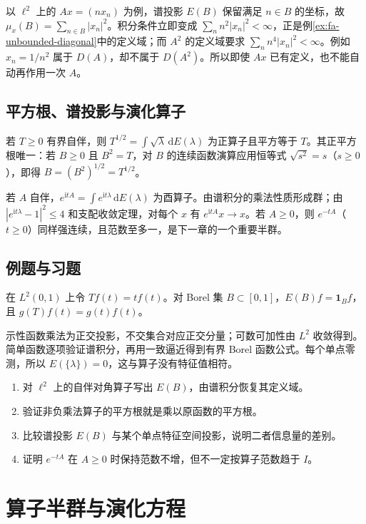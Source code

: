 \documentclass[UTF8,12pt,a4paper,fontset=fandol]{ctexbook}
\begin{document}
以 $\ell^2$ 上的 $Ax=(nx_n)$ 为例，谱投影 $E(B)$ 保留满足 $n\in B$ 的坐标，故 $\mu_x(B)=\sum_{n\in B}|x_n|^2$。积分条件立即变成 $\sum_n n^2|x_n|^2<\infty$，正是例\ref{ex:fa-unbounded-diagonal}中的定义域；而 $A^2$ 的定义域要求 $\sum_n n^4|x_n|^2<\infty$。例如 $x_n=1/n^2$ 属于 $D(A)$，却不属于 $D(A^2)$。所以即使 $Ax$ 已有定义，也不能自动再作用一次 $A$。

\section{平方根、谱投影与演化算子}
若 $T\geq0$ 有界自伴，则 $T^{1/2}=\int\sqrt\lambda\,\mathrm dE(\lambda)$ 为正算子且平方等于 $T$。其正平方根唯一：若 $B\geq0$ 且 $B^2=T$，对 $B$ 的连续函数演算应用恒等式 $\sqrt{s^2}=s$（$s\geq0$），即得 $B=(B^2)^{1/2}=T^{1/2}$。

若 $A$ 自伴，$e^{\mathrm itA}=\int e^{\mathrm it\lambda}\,\mathrm dE(\lambda)$ 为酉算子。由谱积分的乘法性质形成群；由 $|e^{\mathrm it\lambda}-1|^2\leq4$ 和支配收敛定理，对每个 $x$ 有 $e^{\mathrm itA}x\to x$。若 $A\geq0$，则 $e^{-tA}$（$t\geq0$）同样强连续，且范数至多一，是下一章的一个重要半群。

\section{例题与习题}
\begin{example}[乘法算子的谱投影]
在 $L^2(0,1)$ 上令 $Tf(t)=tf(t)$。对 Borel 集 $B\subset[0,1]$，$E(B)f=\mathbf1_Bf$，且 $g(T)f(t)=g(t)f(t)$。
\end{example}
\begin{solve}
示性函数乘法为正交投影，不交集合对应正交分量；可数可加性由 $L^2$ 收敛得到。简单函数逐项验证谱积分，再用一致逼近得到有界 Borel 函数公式。每个单点零测，所以 $E(\{\lambda\})=0$，这与算子没有特征值相符。
\end{solve}
\begin{enumerate}
 \item 对 $\ell^2$ 上的自伴对角算子写出 $E(B)$，由谱积分恢复其定义域。
 \item 验证非负乘法算子的平方根就是乘以原函数的平方根。
 \item 比较谱投影 $E(B)$ 与某个单点特征空间投影，说明二者信息量的差别。
 \item 证明 $e^{-tA}$ 在 $A\geq0$ 时保持范数不增，但不一定按算子范数趋于 $I$。
\end{enumerate}

\chapter{算子半群与演化方程}
\label{chap:fa-semigroups}
\end{document}
